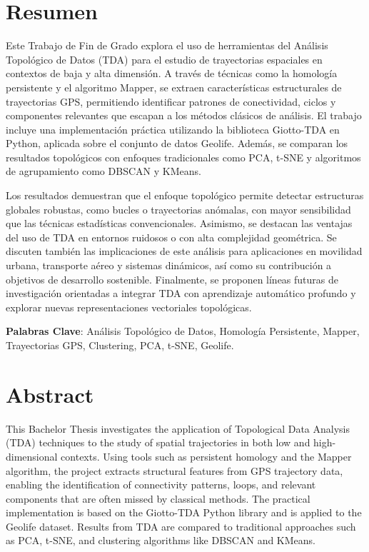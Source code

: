 \chapter*{Resumen} \label{chp:abstract}

Este Trabajo de Fin de Grado explora el uso de herramientas del Análisis Topológico de Datos (TDA) para el estudio de trayectorias espaciales en contextos de baja y alta dimensión. A través de técnicas como la homología persistente y el algoritmo Mapper, se extraen características estructurales de trayectorias GPS, permitiendo identificar patrones de conectividad, ciclos y componentes relevantes que escapan a los métodos clásicos de análisis. El trabajo incluye una implementación práctica utilizando la biblioteca Giotto-TDA en Python, aplicada sobre el conjunto de datos Geolife. Además, se comparan los resultados topológicos con enfoques tradicionales como PCA, t-SNE y algoritmos de agrupamiento como DBSCAN y KMeans.

Los resultados demuestran que el enfoque topológico permite detectar estructuras globales robustas, como bucles o trayectorias anómalas, con mayor sensibilidad que las técnicas estadísticas convencionales. Asimismo, se destacan las ventajas del uso de TDA en entornos ruidosos o con alta complejidad geométrica. Se discuten también las implicaciones de este análisis para aplicaciones en movilidad urbana, transporte aéreo y sistemas dinámicos, así como su contribución a objetivos de desarrollo sostenible. Finalmente, se proponen líneas futuras de investigación orientadas a integrar TDA con aprendizaje automático profundo y explorar nuevas representaciones vectoriales topológicas.

\textbf{Palabras Clave}: Análisis Topológico de Datos, Homología Persistente, Mapper, Trayectorias GPS, Clustering, PCA, t-SNE, Geolife.


\newpage


\chapter*{Abstract}

This Bachelor Thesis investigates the application of Topological Data Analysis (TDA) techniques to the study of spatial trajectories in both low and high-dimensional contexts. Using tools such as persistent homology and the Mapper algorithm, the project extracts structural features from GPS trajectory data, enabling the identification of connectivity patterns, loops, and relevant components that are often missed by classical methods. The practical implementation is based on the Giotto-TDA Python library and is applied to the Geolife dataset. Results from TDA are compared to traditional approaches such as PCA, t-SNE, and clustering algorithms like DBSCAN and KMeans.

